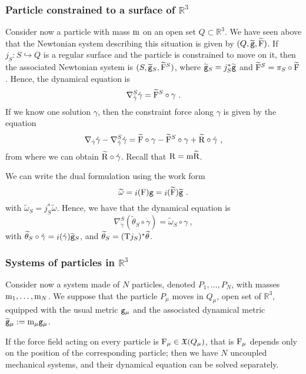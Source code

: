 \documentclass[12pt]{report}
\def\moment#1#2#3{{#1}_{#2}, \ldots, {#1}_{#3}}
\def\vf{\mathfrak X}
\def\Real{\mathbb{R}}
\def\Tan{{\rm T}}
\def\inn{\mathop{i}\nolimits}
\begin{document}
\subsubsection{Particle constrained to a surface of $\Real^3$}

Consider now a particle with mass ${\rm m}$ on an open set
$Q\subset\Real^3$. We have seen above that the Newtonian system describing this situation is given by $(Q,\widetilde{\tt g},\widetilde{\rm F})$.
If $j_S\colon S\hookrightarrow Q$ is a regular surface and the particle is constrained to move on it, then the associated Newtonian system is $(S,\widetilde {\tt g}_S,\widetilde{\rm F}^S)$, where
$\widetilde{\tt g}_S=j_S^*\widetilde {\tt g}$ and $\widetilde{\rm F}^S=\pi_S\circ\widetilde{\rm F}$.
Hence, the dynamical equation is
$$
\nabla^S_{\dot\gamma}\dot\gamma=\widetilde{\rm F}^S\circ\gamma \ .
$$
If we know one solution $\gamma$, then the constraint force along $\gamma$ is given by the equation
$$
\nabla_{\dot\gamma}\dot\gamma -\nabla^S_{\dot\gamma}\dot\gamma=
\widetilde{\rm F}\circ\gamma-\widetilde{\rm F}^S\circ\gamma +\widetilde{\rm R}\circ\dot\gamma \ ,
$$
from where we can obtain $\widetilde{\rm R}\circ\dot\gamma$. 
Recall that ${\rm R}={\rm m}\widetilde{\rm R}$.

We can write the dual formulation using the work form
$$
\widetilde\omega=\inn({\rm F}){\tt g}=\inn(\widetilde{\rm F})\widetilde{\tt g} \ .
$$
with $\widetilde\omega_S=j_S^*\widetilde\omega$. 
Hence, we have that the dynamical equation is
$$
\nabla^S_{\dot\gamma}(\widetilde\theta_S\circ\dot\gamma)=\widetilde\omega_S\circ\gamma \ ,
$$
with $\widetilde\theta_S\circ\dot\gamma=\inn(\dot\gamma)\widetilde {\tt g}_S$,
and $\widetilde\theta_S=(\Tan j_S)^*\widetilde\theta$.

\subsubsection{Systems of particles in $\Real^3$}

Consider now a system made of $N$ particles, denoted  $\moment{P}{1}{N}$,
with masses $\moment{{\rm m}}{1}{N}$. We suppose that the particle $P_\mu$ moves in $Q_\mu$, open set of $\Real^3$, equipped with the usual metric ${\tt g}_\mu$ and the associated dynamical metric $\widetilde{\tt g}_\mu:={\rm m}_\mu {\tt g}_\mu$.

If the force field acting on every particle is
${\rm F}_\mu\in\vf (Q_\mu)$, that is ${\rm F}_\mu$ depends only on the position of the corresponding particle;
then we have  $N$ uncoupled mechanical systems, and their dynamical equation can be solved separately.
\end{document}

